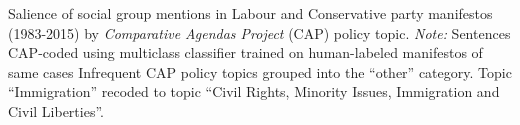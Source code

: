 Salience of social group mentions in Labour and Conservative party manifestos (1983-2015) by \emph{Comparative Agendas Project} (CAP) policy topic. \emph{Note:} Sentences CAP-coded using multiclass classifier trained on human-labeled manifestos of same cases \citep{jennings_agenda_2011} Infrequent CAP policy topics grouped into the ``other'' category. Topic ``Immigration'' recoded to topic ``Civil Rights, Minority Issues, Immigration and Civil Liberties''. \label{fig:uk_manifestos_sg_salience_by_party_and_cap_topic}
